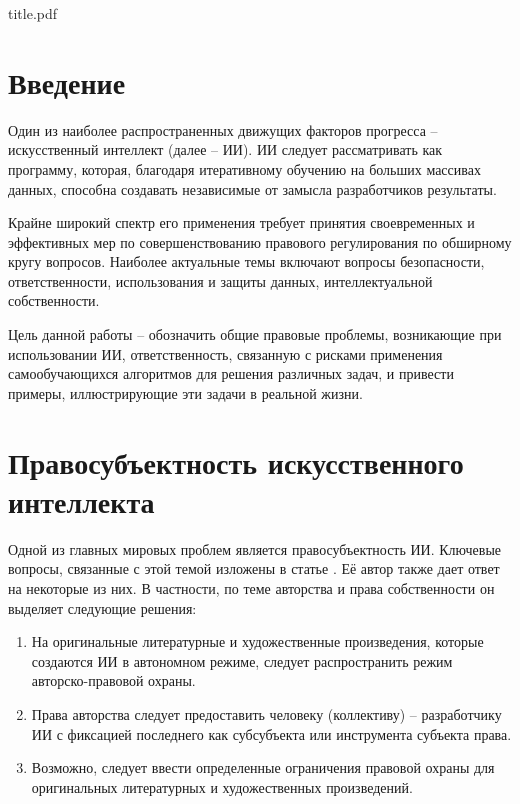 

\def\oldbibitem{}
\let\oldbibitem=\bibitem
\def\bibitem{\stepcounter{citenum}\oldbibitem}



{title.pdf}

\tableofcontents
\newpage

\section{Введение}
Один из наиболее распространенных движущих факторов прогресса – искусственный
интеллект (далее – ИИ). ИИ следует рассматривать как программу, которая, благодаря
итеративному обучению на больших массивах данных, способна создавать независимые от
замысла разработчиков результаты.

Крайне широкий спектр его применения требует принятия
своевременных и эффективных мер по совершенствованию правового регулирования по
обширному кругу вопросов. Наиболее актуальные темы включают вопросы безопасности,
ответственности, использования и защиты данных, интеллектуальной собственности.

Цель данной работы -- обозначить общие правовые проблемы, возникающие при использовании ИИ,
ответственность, связанную с рисками применения самообучающихся алгоритмов для
решения различных задач, и привести примеры, иллюстрирующие эти задачи в реальной жизни.

\newpage
\section{Правосубъектность искусственного интеллекта}
Одной из главных мировых проблем является правосубъектность ИИ. Ключевые вопросы, связанные
с этой темой изложены в статье \cite{II}. Её автор также дает ответ на некоторые из них.
В частности, по теме авторства и права собственности он выделяет следующие решения:

\begin{enumerate}
\item На оригинальные литературные и художественные произведения, которые создаются ИИ в автономном режиме,
следует распространить режим авторско-правовой охраны.
\item Права авторства следует предоставить человеку (коллективу) – разработчику ИИ с фиксацией последнего как
субсубъекта или инструмента субъекта права.
\item Возможно, следует ввести определенные ограничения правовой охраны для оригинальных литературных и художественных произведений.
\end{enumerate}




